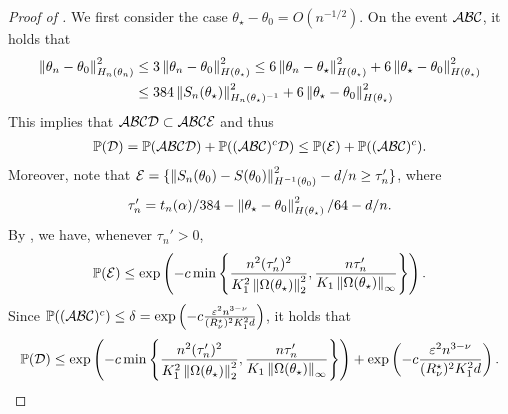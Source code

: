 \begin{proof}[Proof of ]
    We first consider the case $\theta_\star - \theta_0 = O(n^{-1/2})$.
    On the event $\mathcal{A} \mathcal{B} \mathcal{C}$, it holds that
    \begin{align*}
        \left\lVert \theta_n - \theta_0 \right\rVert_{H_n(\theta_n)}^2
        &\le 3\left\lVert \theta_n - \theta_0 \right\rVert_{H(\theta_\star)}^2
        \le 6\left\lVert \theta_n - \theta_\star \right\rVert_{H(\theta_\star)}^2 + 6\left\lVert \theta_\star - \theta_0 \right\rVert_{H(\theta_\star)}^2 \\
        &\le 384\left\lVert S_n(\theta_\star) \right\rVert_{H_n(\theta_\star)^{-1}}^2 + 6\left\lVert \theta_\star - \theta_0 \right\rVert_{H(\theta_\star)}^2
    \end{align*}
    This implies that $\mathcal{A} \mathcal{B} \mathcal{C} \mathcal{D} \subset \mathcal{A} \mathcal{B} \mathcal{C} \mathcal{E}$ and thus
    \begin{align*}
        \operatorname{\mathbb P}(\mathcal{D})
        = \operatorname{\mathbb P}(\mathcal{A} \mathcal{B} \mathcal{C} \mathcal{D}) + \operatorname{\mathbb P}((\mathcal{A} \mathcal{B} \mathcal{C})^c \mathcal{D})
        \le \operatorname{\mathbb P}(\mathcal{E}) + \operatorname{\mathbb P}((\mathcal{A} \mathcal{B} \mathcal{C})^c).
    \end{align*}
    Moreover, note that $\mathcal{E} = \{ \left\lVert S_n(\theta_0) - S(\theta_0) \right\rVert_{H^{-1}(\theta_0)}^2 - d/n \ge \tau_n' \}$, where
    \begin{align*}
        \tau_n' = t_n(\alpha)/384 - \left\lVert \theta_\star - \theta_0 \right\rVert_{H(\theta_\star)}^2/64 - d/n.
    \end{align*}
    By , we have, whenever $\tau_n' > 0$,
    \begin{align*}
        \operatorname{\mathbb P}(\mathcal{E}) \le \exp\left( -c\min\left\{ \frac{n^2 (\tau_n')^2}{K_1^2 \left\lVert \Omega(\theta_\star) \right\rVert_2^2}, \frac{n\tau_n'}{K_1 \left\lVert \Omega(\theta_\star) \right\rVert_\infty} \right\} \right).
    \end{align*}
    Since $\operatorname{\mathbb P}((\mathcal{A} \mathcal{B} \mathcal{C})^c) \le \delta = \exp\left(-c \frac{\varepsilon^2 n^{3-\nu}}{(R_\nu^\star)^2 K_1^2 d} \right)$, it holds that
    \begin{align*}
        \operatorname{\mathbb P}(\mathcal{D})
        \le \exp\left( -c\min\left\{ \frac{n^2 (\tau_n')^2}{K_1^2 \left\lVert \Omega(\theta_\star) \right\rVert_2^2}, \frac{n\tau_n'}{K_1 \left\lVert \Omega(\theta_\star) \right\rVert_\infty} \right\} \right) + \exp\left(-c \frac{\varepsilon^2 n^{3-\nu}}{(R_\nu^\star)^2 K_1^2 d} \right).
    \end{align*}


\end{proof}

